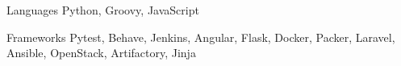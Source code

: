 
\begin{cvskills}
  \cvskill
    {Languages} %
    {Python, Groovy, JavaScript} %

  \cvskill
    {Frameworks} %
    {
        Pytest,
        Behave,
        Jenkins,
        Angular,
        Flask,
        Docker,
        Packer,
        Laravel,
        Ansible,
        OpenStack,
        Artifactory,
        Jinja
    } %

\end{cvskills}

